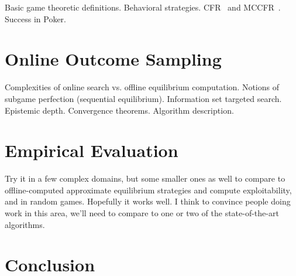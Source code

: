 \documentclass[letterpaper]{article}
\begin{document}
Basic game theoretic definitions. Behavioral strategies. 
CFR~\cite{CFR} and MCCFR~\cite{Lanctot09Sampling}. Success in Poker.

\section{Online Outcome Sampling}

Complexities of online search vs. offline equilibrium computation. Notions of subgame perfection (sequential equilibrium). Information set targeted search. Epistemic depth.
Convergence theorems. Algorithm description.

\section{Empirical Evaluation}

Try it in a few complex domains, but some smaller ones as well to compare to offline-computed approximate equilibrium strategies and compute exploitability, and in random games. 
Hopefully it works well. I think to convince people doing work in this area, we'll need 
to compare to one or two of the state-of-the-art algorithms. 

\section{Conclusion}



\end{document}
